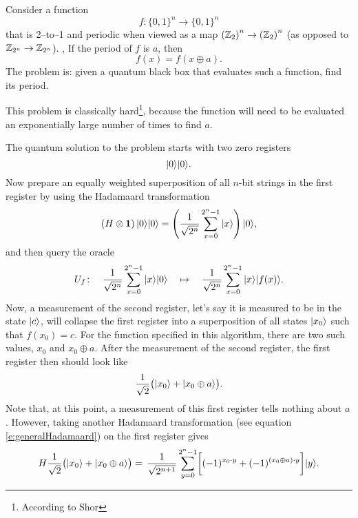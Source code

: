 Consider a function 
\begin{equation}
f\colon\lbrace 0,1\rbrace^n\to\lbrace 0,1\rbrace^n
\end{equation}
that is 2--to--1 and periodic when viewed as a map 
$\left({\mathbb{Z}}_2\right)^n\to\left({\mathbb{Z}}_2\right)^n$
(as opposed to ${\mathbb{Z}}_{2^n}\to{\mathbb{Z}}_{2^n}$).
\ie, If the period of $f$ is $a$, then
\begin{equation}
f(x) = f(x\oplus a).
\end{equation}
The problem is: given a quantum black box that evaluates such a function,
find its period.

This problem is classically hard\footnote{According to Shor\cite{Shor:00}},
because the function will need to be evaluated an exponentially large number
of times to find $a$.

The quantum solution to the problem starts with two zero registers
\begin{equation}
{|{0}\rangle}{|{0}\rangle}.
\end{equation}
Now prepare an equally weighted superposition of all $n$-bit strings
in the first register by using the Hadamaard transformation
\begin{equation}
\left(H\otimes\bf{1}\right){|{0}\rangle}{|{0}\rangle} =
\left(\frac{1}{\sqrt{2^n}}\sum_{x=0}^{2^n-1}{|{x}\rangle}\right){|{0}\rangle},
\end{equation}
and then query the oracle
\begin{equation}
U_f\colon\quad
\frac{1}{\sqrt{2^n}}\sum_{x=0}^{2^n-1}{|{x}\rangle}{|{0}\rangle}\quad\mapsto\quad
\frac{1}{\sqrt{2^n}}\sum_{x=0}^{2^n-1}{|{x}\rangle}{|{f(x)}\rangle}.
\end{equation}
Now, a measurement of the second register, let's say it is measured
to be in the state ${|{c}\rangle}$,
will collapse the first register into a superposition of all 
states ${|{x_0}\rangle}$ such that $f(x_0)=c$.  
For the function specified in this algorithm, 
there are two such values, $x_0$ and $x_0\oplus a$.
After the measurement of the second register, 
the first register then should look like 
\begin{equation}
\frac{1}{\sqrt{2}}\bigl({|{x_0}\rangle}+{|{x_0\oplus a}\rangle}\bigr).
\end{equation}
Note that, at this point, a measurement of this first register tells
nothing about $a$.  However, taking another Hadamaard transformation 
(see equation \ref{e:generalHadamaard})
on the first register gives 
\begin{equation}
H \frac{1}{\sqrt{2}}\bigl({|{x_0}\rangle}+{|{x_0\oplus a}\rangle}\bigr)=
\,\frac{1}{\sqrt{2^{n+1}}}\sum_{y=0}^{2^n-1}
\biggl[(-1)^{x_0\cdot y}+(-1)^{(x_0\oplus a)\cdot y}\biggr]{|{y}\rangle}.
\end{equation}
